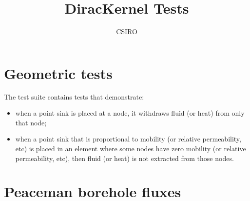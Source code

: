 \documentclass[]{scrreprt}
\begin{document}
\title{DiracKernel Tests}
\author{CSIRO}
\maketitle

\tableofcontents

\chapter{Geometric tests}

The test suite contains tests that demonstrate:
\begin{itemize}
\item when a point sink is placed at a node, it withdraws fluid (or heat) from only that node;
\item when a point sink that is proportional to mobility (or relative
  permeability, etc) is placed in an element where some nodes have
  zero mobility (or relative permeability, etc), then fluid (or heat)
  is not extracted from those nodes.
\end{itemize}

\chapter{Peaceman borehole fluxes}
\end{document}
